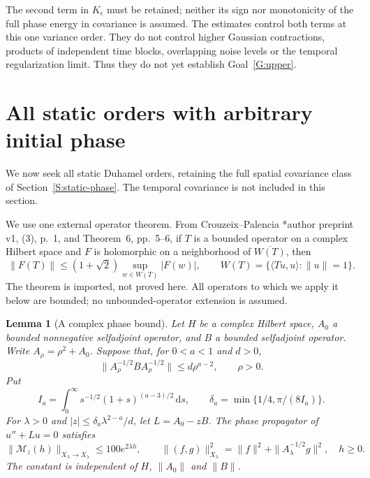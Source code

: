 \documentclass[12pt]{article}
\numberwithin{equation}{section}
\newtheorem{lemma}[theorem]{Lemma}
\theoremstyle{definition}
\newcommand{\ud}{\,\mathrm{d}}
\begin{document}
The second term in $K_\epsilon$ must be retained; neither its sign nor
monotonicity of the full phase energy in covariance is assumed. The estimates
control both terms at this one variance order. They do not control higher
Gaussian contractions, products of independent time blocks, overlapping
noise levels or the temporal regularization limit. Thus they do not yet
establish Goal~\ref{G:upper}.

\section{All static orders with arbitrary initial phase}
\label{S:static-all-orders}

We now seek all static Duhamel orders, retaining the full spatial
covariance class of Section~\ref{S:static-phase}. The temporal
covariance is not included in this section.


We use one external operator theorem. From Crouzeix--Palencia
\cite{crouzeix.palencia:source2017:numerical}*{author preprint v1,
(3), p.~1, and Theorem~6, pp.~5--6}, if $T$ is a bounded operator on a
complex Hilbert space and $F$ is holomorphic on a neighborhood of
$\overline{W(T)}$, then
\begin{equation}\label{E:cp-input}
  \|F(T)\|\le(1+\sqrt2)\sup_{w\in W(T)}|F(w)|,\qquad
  W(T)=\{\langle Tu,u\rangle:\|u\|=1\}.
\end{equation}
The theorem is imported, not proved here. All operators to which we
apply it below are bounded; no unbounded-operator extension is assumed.

\begin{lemma}[A complex phase bound]\label{L:complex-phase}
  Let $H$ be a complex Hilbert space, $A_0$ a bounded nonnegative
  selfadjoint operator, and $B$ a bounded selfadjoint operator.
  Write $A_\rho=\rho^2+A_0$. Suppose that, for $0<a<1$ and $d>0$,
  \begin{equation}\label{E:abstract-sandwich}
    \|A_\rho^{-1/2}BA_\rho^{-1/2}\|\le d\rho^{a-2},
    \qquad \rho>0.
  \end{equation}
  Put
  \[
    I_a=\int_0^\infty s^{-1/2}(1+s)^{(a-3)/2}\ud s,\qquad
    \delta_a=\min\{1/4,\pi/(8I_a)\}.
  \]
  For $\lambda>0$ and $|z|\le\delta_a\lambda^{2-a}/d$, let
  $L=A_0-zB$. The phase propagator of $u''+Lu=0$ satisfies
  \begin{equation}\label{E:complex-phase-bound}
    \|\mathcal M_z(h)\|_{X_\lambda\to X_\lambda}
    \le100e^{2\lambda h},\qquad
    \|(f,g)\|_{X_\lambda}^2
    =\|f\|^2+\|A_\lambda^{-1/2}g\|^2,\quad h\ge0.
  \end{equation}
  The constant is independent of $H$, $\|A_0\|$ and $\|B\|$.
\end{lemma}
\end{document}
